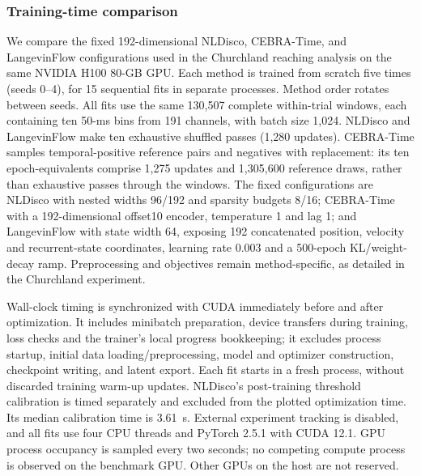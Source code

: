 \subsubsection{Training-time comparison}
\label{subsubsection:training_time_comparison}

We compare the fixed 192-dimensional NLDisco, CEBRA-Time, and LangevinFlow
configurations used in the Churchland reaching analysis on the same NVIDIA
H100 80-GB GPU. Each method is trained from scratch five times (seeds 0--4),
for 15 sequential fits in separate processes. Method order rotates between
seeds. All fits use the same 130,507 complete within-trial windows, each
containing ten 50-ms bins from 191 channels, with batch size 1,024.
NLDisco and LangevinFlow make ten exhaustive shuffled passes (1,280 updates).
CEBRA-Time samples temporal-positive reference pairs and negatives with
replacement: its ten epoch-equivalents comprise 1,275 updates and 1,305,600
reference draws, rather than exhaustive passes through the windows.
The fixed configurations are NLDisco with nested widths 96/192 and sparsity
budgets 8/16; CEBRA-Time with a 192-dimensional offset10 encoder, temperature
1 and lag 1; and LangevinFlow with state width 64, exposing 192 concatenated
position, velocity and recurrent-state coordinates, learning rate 0.003 and
a 500-epoch KL/weight-decay ramp. Preprocessing and objectives remain
method-specific, as detailed in the Churchland experiment.

Wall-clock timing is synchronized with CUDA immediately before and after
optimization. It includes minibatch preparation, device transfers during
training, loss checks and the trainer's local progress bookkeeping; it
excludes process startup, initial data loading/preprocessing, model and
optimizer construction, checkpoint writing, and latent export. Each fit
starts in a fresh process, without discarded training warm-up updates.
NLDisco's post-training threshold calibration is timed separately and
excluded from the plotted optimization time. Its median calibration time
is 3.61~s. External experiment tracking is disabled, and all
fits use four CPU threads and PyTorch 2.5.1 with CUDA 12.1. GPU process
occupancy is sampled every two seconds; no competing compute process is
observed on the benchmark GPU. Other GPUs on the host are not reserved.

